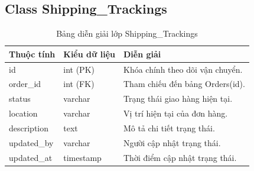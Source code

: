 \subsection{Class Shipping\_Trackings}

\begin{table}[H]
\centering
\caption{Bảng diễn giải lớp Shipping\_Trackings}
\label{tab:shipping_trackings}
\begin{tabular}{|l|l|p{7cm}|}
\hline
\textbf{Thuộc tính} & \textbf{Kiểu dữ liệu} & \textbf{Diễn giải} \\ \hline
id & int (PK) & Khóa chính theo dõi vận chuyển. \\ \hline
order\_id & int (FK) & Tham chiếu đến bảng Orders(id). \\ \hline
status & varchar & Trạng thái giao hàng hiện tại. \\ \hline
location & varchar & Vị trí hiện tại của đơn hàng. \\ \hline
description & text & Mô tả chi tiết trạng thái. \\ \hline
updated\_by & varchar & Người cập nhật trạng thái. \\ \hline
updated\_at & timestamp & Thời điểm cập nhật trạng thái. \\ \hline
\end{tabular}
\end{table}
\clearpage 